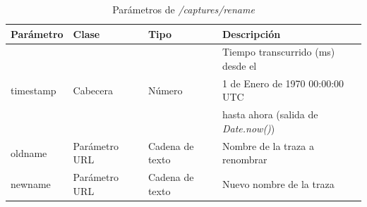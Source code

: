 \begin{table}[H]
\centering
\begin{tabular}{|l|l|l|l|}
\hline
\rowcolor[HTML]{F5F5F5}
\textbf{Parámetro}  & \textbf{Clase} & \textbf{Tipo}   & \textbf{Descripción}                        \\ \hline
                    &                &                 & Tiempo transcurrido (ms) desde el           \\
timestamp           & Cabecera       & Número          & 1 de Enero de 1970 00:00:00 UTC             \\
                    &                &                 & hasta ahora (salida de \textit{Date.now()}) \\ \hline
oldname             & Parámetro URL  & Cadena de texto & Nombre de la \gls{traza} a renombrar        \\ \hline
newname             & Parámetro URL  & Cadena de texto & Nuevo nombre de la \gls{traza}              \\ \hline
\end{tabular}
\caption{Parámetros de \textit{/captures/rename}}
\label{extra:api:capturesrename:invocacion}
\end{table}

